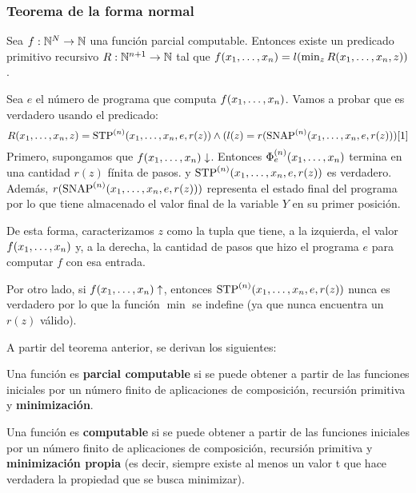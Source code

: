\subsubsection{Teorema de la forma normal}
	\begin{teorema}\label{teorema::formaNormal}
	Sea $f:\mathbb{N}^N\to\mathbb{N}$ una función parcial computable. Entonces existe un predicado primitivo recursivo $R:\mathbb{N}^{n+1}\to\mathbb{N}$ tal que $f(x_1,\dots, x_{n}) = l(\min_z R(x_1,\dots, x_{n},z))$.
\end{teorema}
\begin{demo}
Sea $e$ el número de programa que computa $f(x_1,\dots, x_{n })$. Vamos a probar que es verdadero usando el predicado:
$$R(x_1,\dots, x_{n}, z) = \text{STP}^{(n)}(x_1,\dots, x_{n},e,r(z)) \land (l(z) = r(\text{SNAP}^{(n)}(x_1,\dots, x_{n},e,r(z)))[1]$$
Primero, supongamos que $f(x_1,\dots, x_{n})\downarrow$. Entonces $\Phi_e^{(n)}(x_1,\dots, x_{n})$ termina en una cantidad  $r(z)$ fínita de pasos.  y $\text{STP}^{(n)}(x_1,\dots, x_{n},e,r(z))$ es verdadero. Además, $r(\text{SNAP}^{(n)}(x_1,\dots, x_{n},e,r(z)))$ representa el estado final del programa por lo que tiene almacenado el valor final de la variable $Y$ en su primer posición.

De esta forma, caracterizamos $z$ como la tupla que tiene, a la izquierda, el valor $f(x_1,\dots, x_{n})$ y, a la derecha, la cantidad de pasos que hizo el programa $e$ para computar $f$ con esa entrada.

Por otro lado, si $f(x_1,\dots, x_{n})\uparrow$, entonces $\text{STP}^{(n)}(x_1,\dots, x_{n},e,r(z))$ nunca es verdadero por lo que la función $\min$ se indefine (ya que nunca encuentra un $r(z)$ válido).
\end{demo}

A partir del teorema anterior, se derivan los siguientes:

\begin{teorema}
	Una función es \textbf{parcial computable} si se puede obtener a partir de las funciones iniciales por un número finito de aplicaciones de composición, recursión primitiva y \textbf{minimización}.
\end{teorema}

\begin{teorema}
	Una función es \textbf{computable} si se puede obtener a partir de las funciones iniciales por un número finito de aplicaciones de composición, recursión primitiva y \textbf{minimización propia} (es decir, siempre existe al menos un valor t que hace verdadera la propiedad que se busca minimizar).
\end{teorema}
